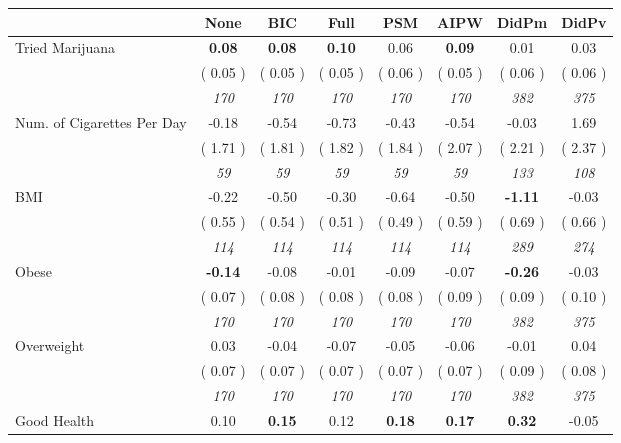 \begin{tabular}{l c c c c c c c}
\toprule
 & None & BIC & Full & PSM & AIPW & DidPm & DidPv \\
\midrule
Tried Marijuana & \textbf{      0.08 } & \textbf{      0.08 } & \textbf{      0.10 } &      0.06 & \textbf{     0.09} &      0.01 &      0.03 \\
& (     0.05 ) & (     0.05 ) & (     0.05 ) & (     0.06 ) & (     0.05 ) & (     0.06 ) & (     0.06 ) \\
& \textit{ 170 } & \textit{ 170 } & \textit{ 170 } & \textit{ 170 } & \textit{ 170 } & \textit{ 382 } & \textit{ 375 } \\
Num. of Cigarettes Per Day &     -0.18 &     -0.54 &     -0.73 &     -0.43 &     -0.54 &     -0.03 &      1.69 \\
& (     1.71 ) & (     1.81 ) & (     1.82 ) & (     1.84 ) & (     2.07 ) & (     2.21 ) & (     2.37 ) \\
& \textit{ 59 } & \textit{ 59 } & \textit{ 59 } & \textit{ 59 } & \textit{ 59 } & \textit{ 133 } & \textit{ 108 } \\
BMI &     -0.22 &     -0.50 &     -0.30 &     -0.64 &     -0.50 & \textbf{     -1.11 } &     -0.03 \\
& (     0.55 ) & (     0.54 ) & (     0.51 ) & (     0.49 ) & (     0.59 ) & (     0.69 ) & (     0.66 ) \\
& \textit{ 114 } & \textit{ 114 } & \textit{ 114 } & \textit{ 114 } & \textit{ 114 } & \textit{ 289 } & \textit{ 274 } \\
Obese & \textbf{     -0.14 } &     -0.08 &     -0.01 &     -0.09 &     -0.07 & \textbf{     -0.26 } &     -0.03 \\
& (     0.07 ) & (     0.08 ) & (     0.08 ) & (     0.08 ) & (     0.09 ) & (     0.09 ) & (     0.10 ) \\
& \textit{ 170 } & \textit{ 170 } & \textit{ 170 } & \textit{ 170 } & \textit{ 170 } & \textit{ 382 } & \textit{ 375 } \\
Overweight &      0.03 &     -0.04 &     -0.07 &     -0.05 &     -0.06 &     -0.01 &      0.04 \\
& (     0.07 ) & (     0.07 ) & (     0.07 ) & (     0.07 ) & (     0.07 ) & (     0.09 ) & (     0.08 ) \\
& \textit{ 170 } & \textit{ 170 } & \textit{ 170 } & \textit{ 170 } & \textit{ 170 } & \textit{ 382 } & \textit{ 375 } \\
Good Health &      0.10 & \textbf{      0.15 } &      0.12 & \textbf{     0.18} & \textbf{     0.17} & \textbf{      0.32 } &     -0.05 \\

\end{tabular}
